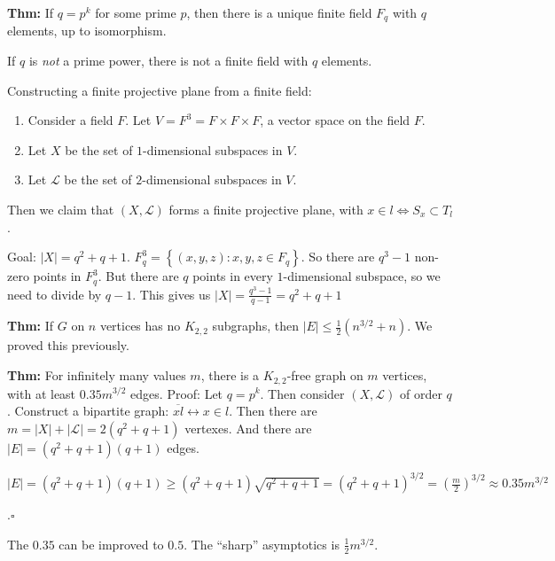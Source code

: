\documentclass[10pt,letterpaper]{article}
\newcommand{\n}{\hfill\break}
\newcommand{\thm}[1]{\par\noindent\settowidth{\hangindent}{\textbf{Thm: }}\textbf{Thm: }#1\n}
\newcommand{\proven}{\;$\square$\n}
\newcommand{\inlineeq}[1]{\centerline{$\displaystyle #1$}}
\newcommand{\card}[1]{\left|#1\right|}
\newcommand{\set}[1]{\left\{#1\right\}}
\begin{document}
\thm{If $q=p^{k}$ for some prime $p$, then there is a unique finite field $F_{q}$ with $q$ elements, up to isomorphism.}

\par\noindent If $q$ is \textit{not} a prime power, there is not a finite field with $q$ elements.\n

\par\noindent Constructing a finite projective plane from a finite field:
\begin{enumerate}
	\item Consider a field $F$. Let $V=F^{3}=F\times{}F\times{}F$, a vector space on the field $F$.
	\item Let $X$ be the set of $1$-dimensional subspaces in $V$.
	\item Let $\mathscr{L}$ be the set of $2$-dimensional subspaces in $V$.
\end{enumerate}
\par\noindent Then we claim that $(X,\mathscr{L})$ forms a finite projective plane, with $x\in{}l\Leftrightarrow{}S_{x}\subset{}T_{l}$.\n

\par\noindent Goal: $\card{X}=q^{2}+q+1$.\n
$F_{q}^{3}=\set{(x,y,z):x,y,z\in{}F_{q}}$. So there are $q^{3}-1$ non-zero points in $F_{q}^{3}$. But there are $q$ points in every $1$-dimensional subspace, so we need to divide by $q-1$. This gives us $\card{X}=\frac{q^{3}-1}{q-1}=q^{2}+q+1$\n

\thm{If $G$ on $n$ vertices has no $K_{2,2}$ subgraphs, then $\card{E}\le\frac{1}{2}(n^{3/2}+n)$. We proved this previously.}

\thm{For infinitely many values $m$, there is a $K_{2,2}$-free graph on $m$ vertices, with at least $0.35m^{3/2}$ edges.\n
Proof: Let $q=p^{k}$. Then consider $(X,\mathscr{L})$ of order $q$. Construct a bipartite graph: $\overline{xl}\leftrightarrow{}x\in{}l$.\n
Then there are $m=\card{X}+\card{\mathscr{L}}=2(q^{2}+q+1)$ vertexes.\n
And there are $\card{E}=(q^{2}+q+1)(q+1)$ edges.\n
\inlineeq{\card{E}=(q^{2}+q+1)(q+1)\ge(q^{2}+q+1)\sqrt{q^{2}+q+1}=(q^{2}+q+1)^{3/2}=\left(\frac{m}{2}\right)^{3/2}\approx{}0.35m^{3/2}}.\proven}

\par\noindent The $0.35$ can be improved to $0.5$. The ``sharp'' asymptotics is $\frac{1}{2}m^{3/2}$.
\end{document}
